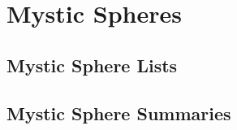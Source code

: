 \chapter{Mystic Spheres}\label{Mystic Spheres}

\section{Mystic Sphere Lists}\label{Mystic Sphere Lists}

    

\section{Mystic Sphere Summaries}\label{Mystic Sphere Summaries}

    


